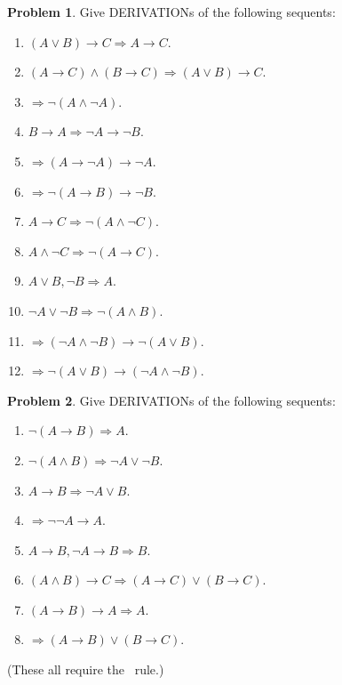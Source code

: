 \documentclass[10pt,a4paper]{article}
\newcommand*{\olup}[1]{\MakeUppercase{#1}}
\theoremstyle{plain}
\theoremstyle{definition}
\newtheorem{prob}{Problem}[section]
\theoremstyle{remark}
\providecommand{\lif}{\mathbin{\rightarrow}}
\providecommand{\Sequent}{\mathrel{\Rightarrow}}
\providecommand{\RightR}[1]{}
\providecommand{\RightR}{\mathrm{R}}
\providecommand{\Contraction}{\mathrm{C}}
\begin{document}
\begin{prob}
Give \olup{derivation}s of the following sequents:
\begin{enumerate}
\item $(A \lor B) \lif C \Sequent A \lif C$.
\item $(A \lif C) \land (B \lif C) \Sequent (A \lor B) \lif C$.
\item $\Sequent \lnot(A \land \lnot A)$.
\item $B \lif A \Sequent \lnot A \lif \lnot B$.
\item $\Sequent (A \lif \lnot A) \lif \lnot A$.
\item $\Sequent \lnot(A \lif B) \lif \lnot B$.
\item $A \lif C \Sequent \lnot (A \land \lnot C)$.
\item $A \land \lnot C \Sequent \lnot (A \lif C)$.
\item $A \lor B, \lnot B \Sequent A$.
\item $\lnot A \lor \lnot B \Sequent \lnot(A \land B)$.
\item $\Sequent (\lnot A \land \lnot B) \lif\lnot(A \lor B)$.
\item $\Sequent \lnot(A \lor B) \lif (\lnot A \land \lnot B)$.
\end{enumerate}
\end{prob}

\begin{prob}
Give \olup{derivation}s of the following sequents:
\begin{enumerate}
\item $\lnot(A \lif B) \Sequent A$.
\item $\lnot(A \land B) \Sequent \lnot A \lor \lnot B$.
\item $A \lif B \Sequent \lnot A \lor B$.
\item $\Sequent \lnot \lnot A \lif A$.
\item $A \lif B, \lnot A \lif B \Sequent B$.
\item $(A \land B) \lif C \Sequent (A \lif C) \lor (B \lif C)$.
\item $(A \lif B) \lif A \Sequent A$.
\item $\Sequent (A \lif B) \lor (B \lif C)$.
\end{enumerate}
(These all require the $\RightR{\Contraction}$~rule.)
\end{prob}

\end{document}
